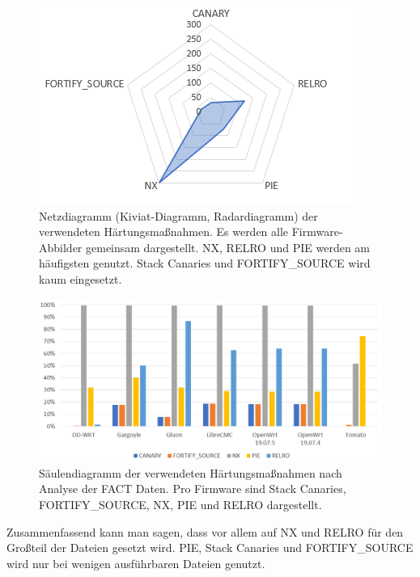 \documentclass[a4paper]{book}
\begin{document}
\begin{large}
\begin{onehalfspace}
\begin{figure}[ht]
\begin{center}
\includegraphics[scale=0.65]{images/hardening_open_source} 
\caption{Netzdiagramm (Kiviat-Diagramm, Radardiagramm) der verwendeten Härtungsmaßnahmen. Es werden alle Firmware-Abbilder gemeinsam dargestellt. NX, RELRO und PIE werden am häufigsten genutzt. Stack Canaries und FORTIFY\_SOURCE wird kaum eingesetzt.}
\label{fig:Firmware Hardening Net}
\end{center}
\end{figure}


\begin{figure}[ht]
\begin{center}
\includegraphics[scale=0.5]{images/hardening_open_source_all} 
\caption{Säulendiagramm der verwendeten Härtungsmaßnahmen nach Analyse der FACT Daten. Pro Firmware sind Stack Canaries, FORTIFY\_SOURCE, NX, PIE und RELRO dargestellt.}
\label{fig:Firmware Hardening Bar}
\end{center}
\end{figure}



\indent Zusammenfassend kann man sagen, dass vor allem auf NX und RELRO für den Großteil der Dateien gesetzt wird. PIE, Stack Canaries und FORTIFY\_SOURCE wird nur bei wenigen ausführbaren Dateien genutzt. 


\end{onehalfspace}
\end{large}
\end{document}
